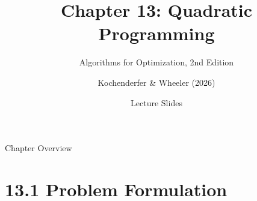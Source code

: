 \documentclass[aspectratio=169,10pt]{beamer}
\title[Ch.~13: Quadratic Programming]{Chapter 13: Quadratic Programming}
\subtitle{Algorithms for Optimization, 2nd Edition}
\author{Kochenderfer \& Wheeler (2026)}
\date{Lecture Slides}
\institute{MIT Press}
\begin{document}
\begin{frame}
  \titlepage
\end{frame}

\begin{frame}{Chapter Overview}
  \tableofcontents
\end{frame}


\section{13.1 Problem Formulation}
\end{document}
